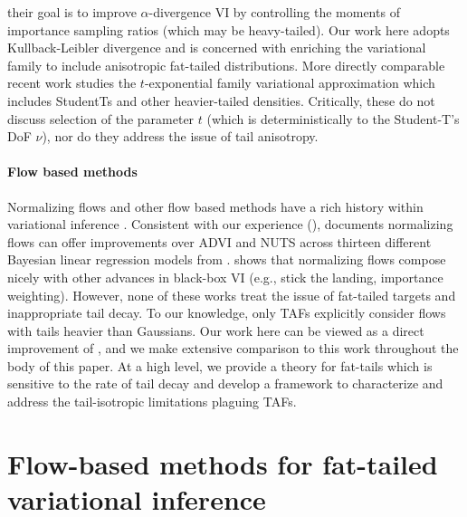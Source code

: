 \documentclass{article}
\theoremstyle{definition}
\theoremstyle{remark}
\begin{document}
their goal is to improve $\alpha$-divergence VI by controlling the moments of importance
sampling ratios (which may be heavy-tailed). Our work here adopts
Kullback-Leibler divergence and is concerned with enriching the variational family
to include anisotropic fat-tailed distributions.
More directly comparable recent work \cite{ding2011t,futami2017expectation} studies the $t$-exponential family
variational approximation which includes StudentTs and other
heavier-tailed densities. Critically, these do
not discuss selection of the parameter $t$ (which is deterministically to the
Student-T's DoF $\nu$), nor do they address the issue of tail anisotropy. %

\vspace{-1mm}
\paragraph{Flow based methods}

Normalizing flows and other flow based methods have a rich history within variational
inference \citep{kingma2016improved,rezende2015variational,agrawal2020advances,webb2019improving}.
Consistent with our experience (), \citep{webb2019improving}
documents normalizing flows can offer improvements over ADVI and NUTS across thirteen different
Bayesian linear regression models from \citep{gelman2006data}.
\citep{agrawal2020advances} shows that normalizing flows compose nicely with other
advances in black-box VI (e.g., stick the landing, importance weighting).
However, none of these works treat the issue of fat-tailed targets and inappropriate tail
decay.
To our knowledge, only TAFs \citep{jaini2020tails} explicitly consider flows with tails
heavier than Gaussians. Our work here can be viewed as a direct improvement of \citep{jaini2020tails},
and we make extensive comparison to this work throughout the body of this paper. At
a high level, we provide a theory for fat-tails which is sensitive to the rate of
tail decay and develop a framework to characterize and address the tail-isotropic limitations plaguing
TAFs.

\vspace{-2mm}
\section{Flow-based methods for fat-tailed variational inference}
\end{document}
